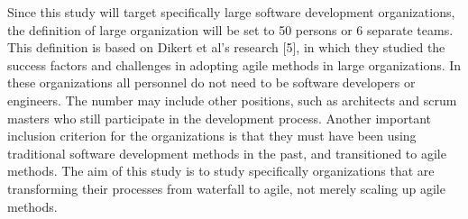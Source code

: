 Since this study will target specifically large software development
organizations, the definition of large organization will be set to
50 persons or 6 separate teams. This definition is based on Dikert
et al's research [5], in which they studied the success factors and
challenges in adopting agile methods in large organizations. In these
organizations all personnel do not need to be software developers or
engineers. The number may include other positions, such as architects
and scrum masters who still participate in the development process.
Another important inclusion criterion for the organizations is that they
must have been using traditional software development methods in the
past, and transitioned to agile methods. The aim of this study is to
study specifically organizations that are transforming their processes
from waterfall to agile, not merely scaling up agile methods.
